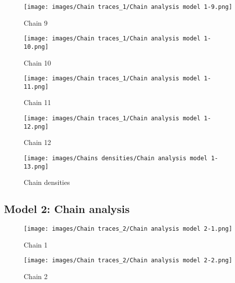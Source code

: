 \documentclass[12pt]{article}
\begin{document}
\begin{figure}[!htb]
   \begin{minipage}{0.48\textwidth}
     \centering
     \texttt{[image: images/Chain traces\_1/Chain analysis model 1-9.png]}
     \caption{Chain 9}\label{Fig:Chain 9}
   \end{minipage}\hfill
   \begin{minipage}{0.48\textwidth}
     \centering
     \texttt{[image: images/Chain traces\_1/Chain analysis model 1-10.png]}
     \caption{Chain 10}\label{Fig: Chain 10}
   \end{minipage}
\end{figure}

\begin{figure}[!htb]
   \begin{minipage}{0.48\textwidth}
     \centering
     \texttt{[image: images/Chain traces\_1/Chain analysis model 1-11.png]}
     \caption{Chain 11}\label{Fig:Chain 11}
   \end{minipage}\hfill
   \begin{minipage}{0.48\textwidth}
     \centering
     \texttt{[image: images/Chain traces\_1/Chain analysis model 1-12.png]}
     \caption{Chain 12}\label{Fig: Chain 12}
   \end{minipage}
\end{figure}


 \begin{figure}[h]
    \centering
    \texttt{[image: images/Chains densities/Chain analysis model 1-13.png]}
    \caption{Chain densities}
    \label{fig:Chain densities}
\end{figure}

\clearpage
\subsection{Model 2: Chain analysis}

\begin{figure}[!htb]
   \begin{minipage}{0.48\textwidth}
     \centering
     \texttt{[image: images/Chain traces\_2/Chain analysis model 2-1.png]}
     \caption{Chain 1}\label{Fig:Chain 1}
   \end{minipage}\hfill
   \begin{minipage}{0.48\textwidth}
     \centering
     \texttt{[image: images/Chain traces\_2/Chain analysis model 2-2.png]}
     \caption{Chain 2}\label{Fig: Chain 2}
   \end{minipage}
\end{figure}
\end{document}
